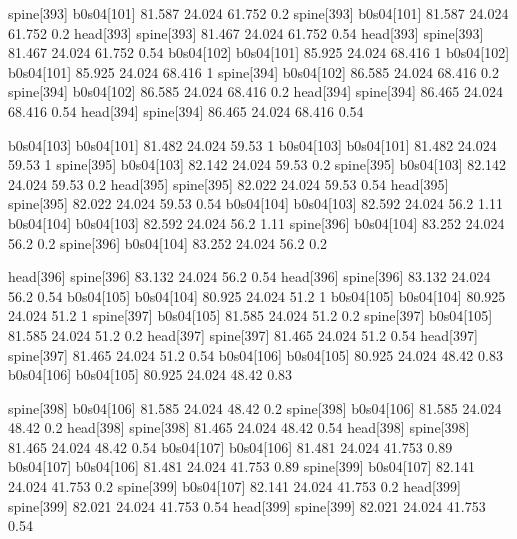 spine[393]    b0s04[101]    81.587    24.024    61.752    0.2
spine[393]    b0s04[101]    81.587    24.024    61.752    0.2
head[393]    spine[393]    81.467    24.024    61.752    0.54
head[393]    spine[393]    81.467    24.024    61.752    0.54
b0s04[102]    b0s04[101]    85.925    24.024    68.416    1
b0s04[102]    b0s04[101]    85.925    24.024    68.416    1
spine[394]    b0s04[102]    86.585    24.024    68.416    0.2
spine[394]    b0s04[102]    86.585    24.024    68.416    0.2
head[394]    spine[394]    86.465    24.024    68.416    0.54
head[394]    spine[394]    86.465    24.024    68.416    0.54


b0s04[103]    b0s04[101]    81.482    24.024    59.53    1
b0s04[103]    b0s04[101]    81.482    24.024    59.53    1
spine[395]    b0s04[103]    82.142    24.024    59.53    0.2
spine[395]    b0s04[103]    82.142    24.024    59.53    0.2
head[395]    spine[395]    82.022    24.024    59.53    0.54
head[395]    spine[395]    82.022    24.024    59.53    0.54
b0s04[104]    b0s04[103]    82.592    24.024    56.2    1.11
b0s04[104]    b0s04[103]    82.592    24.024    56.2    1.11
spine[396]    b0s04[104]    83.252    24.024    56.2    0.2
spine[396]    b0s04[104]    83.252    24.024    56.2    0.2


head[396]    spine[396]    83.132    24.024    56.2    0.54
head[396]    spine[396]    83.132    24.024    56.2    0.54
b0s04[105]    b0s04[104]    80.925    24.024    51.2    1
b0s04[105]    b0s04[104]    80.925    24.024    51.2    1
spine[397]    b0s04[105]    81.585    24.024    51.2    0.2
spine[397]    b0s04[105]    81.585    24.024    51.2    0.2
head[397]    spine[397]    81.465    24.024    51.2    0.54
head[397]    spine[397]    81.465    24.024    51.2    0.54
b0s04[106]    b0s04[105]    80.925    24.024    48.42    0.83
b0s04[106]    b0s04[105]    80.925    24.024    48.42    0.83


spine[398]    b0s04[106]    81.585    24.024    48.42    0.2
spine[398]    b0s04[106]    81.585    24.024    48.42    0.2
head[398]    spine[398]    81.465    24.024    48.42    0.54
head[398]    spine[398]    81.465    24.024    48.42    0.54
b0s04[107]    b0s04[106]    81.481    24.024    41.753    0.89
b0s04[107]    b0s04[106]    81.481    24.024    41.753    0.89
spine[399]    b0s04[107]    82.141    24.024    41.753    0.2
spine[399]    b0s04[107]    82.141    24.024    41.753    0.2
head[399]    spine[399]    82.021    24.024    41.753    0.54
head[399]    spine[399]    82.021    24.024    41.753    0.54


